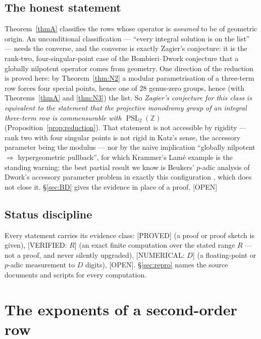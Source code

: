 \documentclass[11pt,reqno]{amsart}
\theoremstyle{plain}
\theoremstyle{definition}
\theoremstyle{remark}
\theoremstyle{plain}
\newcommand{\Z}{\mathbb{Z}}
\DeclareMathOperator{\PSL}{PSL}
\newcommand{\Proved}{\textup{\textsf{[PROVED]}}}
\newcommand{\VerifiedR}[1]{\textup{\textsf{[VERIFIED: #1]}}}
\newcommand{\Numerical}[1]{\textup{\textsf{[NUMERICAL: #1]}}}
\newcommand{\Open}{\textup{\textsf{[OPEN]}}}
\begin{document}
\subsection*{The honest statement}
Theorem~\ref{thmA} classifies the rows whose operator is \emph{assumed} to be of
geometric origin. An unconditional classification --- ``every integral solution is
on the list'' --- needs the converse, and the converse is exactly Zagier's
conjecture: it is the rank-two, four-singular-point case of the Bombieri--Dwork
conjecture that a globally nilpotent operator comes from geometry. One direction
of the reduction is proved here: by Theorem~\ref{thm:N2} a modular
parametrisation of a three-term row forces four special points, hence one of $28$
genus-zero groups, hence (with Theorems~\ref{thmA} and \ref{thm:N3}) the list. So
\emph{Zagier's conjecture for this class is equivalent to the statement that the
projective monodromy group of an integral three-term row is commensurable with
$\PSL_2(\Z)$} (Proposition~\ref{prop:reduction}). That statement is not
accessible by rigidity --- rank two with four singular points is not rigid in
Katz's sense, the accessory parameter being the modulus --- nor by the naive
implication ``globally nilpotent $\Rightarrow$ hypergeometric pullback'', for
which Krammer's Lam\'e example \cite{Krammer1996,MovasatiReiter} is the standing
warning; the best partial result we know is Beukers' $p$-adic analysis of Dwork's
accessory parameter problem in exactly this configuration \cite{Beukers2002},
which does not close it. \S\ref{sec:BD} gives the evidence in place of a proof.
\Open{}

\subsection*{Status discipline}
Every statement carries its evidence class: \Proved{} (a proof or proof sketch is
given), \VerifiedR{$R$} (an exact finite computation over the stated range $R$ ---
not a proof, and never silently upgraded), \Numerical{$D$} (a floating-point or
$p$-adic measurement to $D$ digits), \Open{}. \S\ref{sec:repro} names the source
documents and scripts for every computation.

\section{The exponents of a second-order row}\label{sec:exps}
\end{document}

